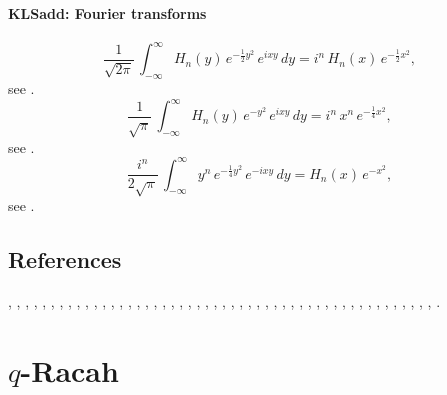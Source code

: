 \documentclass[envcountchap,graybox]{svmono}
\newcommand\half{\frac12}
\newcommand\iy\infty
\begin{document}
\paragraph{\large\bf KLSadd: Fourier transforms}\begin{equation}
\frac1{\sqrt{2\pi}}\,\int_{-\iy}^\iy H_n(y)\,e^{-\half y^2}\,e^{ixy}\,dy=
i^n\,H_n(x)\,e^{-\half x^2},
\label{15}
\end{equation}
see .
\begin{equation}
\frac1{\sqrt\pi}\,\int_{-\iy}^\iy H_n(y)\,e^{-y^2}\,e^{ixy}\,dy=
i^n\,x^n\,e^{-\frac14 x^2},
\label{16}
\end{equation}
see .
\begin{equation}
\frac{i^n}{2\sqrt\pi}\,\int_{-\iy}^\iy y^n\,e^{-\frac14 y^2}\,e^{-ixy}\,dy=
H_n(x)\,e^{-x^2},
\label{17}
\end{equation}
see .
%

\subsection*{References}
\cite{Abreu}, \cite{AlSalam90}, \cite{AndrewsAskey85}, \cite{Askey89I},
\cite{AskeyWilson85}, \cite{AskeyRahmanSuslov}, \cite{Atak97}, \cite{AtakRahmanSuslov},
\cite{AtakSuslov88}, \cite{AtakSuslov92}, \cite{Bang}, \cite{BrownEvansIsmail},
\cite{BrownIsmail}, \cite{GasperRahman86}, \cite{GasperRahman90}, \cite{GrunbaumHaine96},
\cite{GrunbaumHaine97}, \cite{Ismail86I}, \cite{Ismail2003}, \cite{IsmailLetMasVal},
\cite{IsmailLetValWimp91}, \cite{IsmailMasson95}, \cite{IsmailMassonRahman},
\cite{IsmailRahman91}, \cite{IsmailStanton88}, \cite{IsmailWilson}, \cite{KalninsMiller89},
\cite{Koelink94}, \cite{Koelink96I}, \cite{Koorn92}, \cite{Koorn93}, \cite{Koorn2007},
\cite{Leonard}, \cite{Miller89}, \cite{MimachiI}, \cite{NassrallahRahman}, \cite{Nikiforov+},
\cite{NoumiMimachi90I}, \cite{NoumiMimachi92}, \cite{Rahman82}, \cite{Rahman85},
\cite{Rahman86II}, \cite{Rahman88}, \cite{Rahman92}, \cite{Rahman96}, \cite{RahmanSuslov},
\cite{RahmanVerma91}, \cite{Spiridonov97}, \cite{Szwarc}, \cite{Vinet}, \cite{Wilson91}.

\newpage

\section{$q$-Racah}
\par\setcounter{equation}{0}
\end{document}
